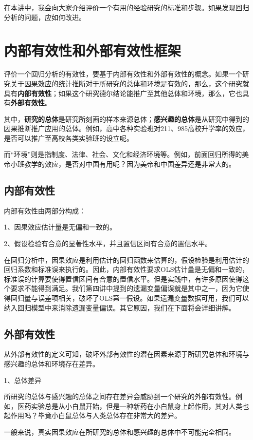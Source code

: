 \documentclass[cn,12pt,math=newtx,citestyle=gb7714-2015,bibstyle=gb7714-2015]{elegantbook}
\begin{document}
在本讲中，我会向大家介绍评价一个有用的经验研究的标准和步骤。如果发现回归分析的问题，应如何改进。

\section{内部有效性和外部有效性框架}
评价一个回归分析的有效性，要基于内部有效性和外部有效性的概念。如果一个研究关于因果效应的统计推断对于所研究的总体和环境是有效的，那么，这个研究就具有\textbf{内部有效性}；如果这个研究德尔结论能推广至其他总体和环境，那么，它也具有\textbf{外部有效性}。

其中，\textbf{研究的总体}是研究所刻画的样本来源总体；\textbf{感兴趣的总体}是从研究中得到的因果推断推广应用的总体。例如，高中各种实验班对211、985高校升学率的效应，是否可以推广至高校各类实验班的设立呢。

而“环境”则是指制度、法律、社会、文化和经济环境等。例如，前面回归所得的美帝小班教学的效应，是否对中国有用呢？因为美帝和中国差异还是非常大的。

\subsection{内部有效性}
内部有效性由两部分构成：

1、因果效应估计量是无偏和一致的。

2、假设检验有合意的显著性水平，并且置信区间有合意的置信水平。

在回归分析中，因果效应是利用估计的回归函数来估算的，假设检验是利用估计的回归系数和标准误来执行的。因此，内部有效性要求OLS估计量是无偏和一致的，标准误的计算要使得置信区间有合意的置信水平。但是实践中，有许多原因使得这个要求不能得到满足。我们第四讲中提到的遗漏变量偏误就是其中之一，因为它使得回归量与误差项相关，破坏了OLS第一假设。如果遗漏变量数据可用，我们可以纳入回归模型中来消除遗漏变量偏误。其它原因，我们在下面将会详细讲解。

\subsection{外部有效性}
从外部有效性的定义可知，破坏外部有效性的潜在因素来源于所研究总体和环境与感兴趣的总体和环境存在差异。

1、总体差异

所研究的总体与感兴趣的总体之间存在差异会威胁到一个研究的外部有效性。例如，医药实验总是从小白鼠开始，但是一种新药在小白鼠身上起作用，其对人类也起作用吗？毕竟小白鼠总体与人类总体存在非常大的差异。

一般来说，真实因果效应在所研究的总体和感兴趣的总体中不可能完全相同。
\end{document}
